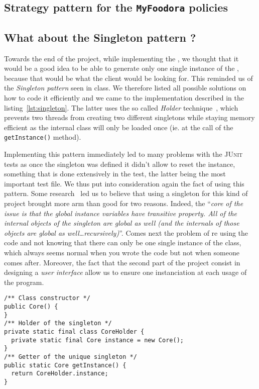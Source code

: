 
\subsection{Strategy pattern for the \texttt{MyFoodora} policies} %
\label{sub:strategy_pattern_for_the_texttt_myfoodora_policies}



\subsection{What about the Singleton pattern ?} %
\label{sub:what_about_the_singleton_pattern}
Towards the end of the project, while implementing the \Core,
we thought that it would be a good idea to be able
to generate only one single instance of the \Core,
because that would be what the client would be looking for.
This reminded us of the \emph{Singleton pattern} seen in class.
We therefore listed all possible solutions on how to code
it efficiently and we came to the implementation described
in the listing~\ref{lst:singleton}.
The latter uses the so called \emph{Holder} technique~\cite{goodSingleton},
which prevents two threads from creating two different singletons
while staying memory efficient as the internal class will only be
loaded once (ie. at the call of the \lstinline|getInstance()| method).

Implementing this pattern immediately led to many problems with
the \textsc{JUnit} tests as once the singleton was defined it
didn't allow to reset the instance, something that is done extensively
in the \Core test, the latter being the most important test file.
We thus put into consideration again the fact of using this pattern.
Some research~\cite{singletonLiars} led us to believe that using a singleton for this kind
of project brought more arm than good for two reasons.
Indeed, the ``\textit{core of the issue is that the global instance 
variables have transitive property. All of the internal objects of the 
singleton are global as well (and the internals of those objects are 
global as well\dots recursively)}''\cite{codeHardToTest}.
Comes next the problem of re using the code and not knowing that
there can only be one single instance of the \Core class,
which always seems normal when you wrote the code but not
when someone comes after.
Moreover, the fact that the second part of the project consist in
designing a \emph{user interface} allow us to ensure one instanciation
at each usage of the program.

\begin{lstlisting}[caption=How the implementation of the Singleton pattern
  would be.,
  label=lst:singleton] 
/** Class constructor */
public Core() {
}
/** Holder of the singleton */
private static final class CoreHolder {		
  private static final Core instance = new Core();
}
/** Getter of the unique singleton */
public static Core getInstance() {
  return CoreHolder.instance;
}
\end{lstlisting}
  

